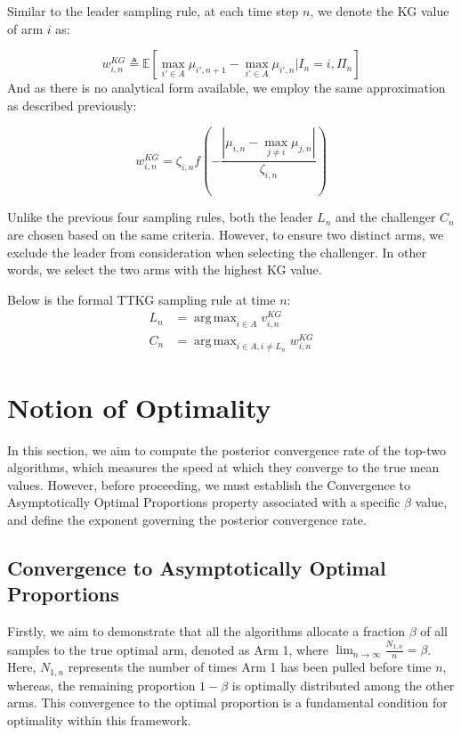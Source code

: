 \documentclass[a4paper, 12pt]{article}
\DeclareMathOperator{\argmax}{arg\,max}
\theoremstyle{definition}
\begin{document}
Similar to the leader sampling rule, at each time step $n$, we denote the KG value of arm $i$ as:

\[
w_{i,n}^{KG} \triangleq \mathbb{E} \left[\max_{i' \in A} \mu_{i',n+1} - \max_{i' \in A} \mu_{i',n} \bigg| I_n = i, \Pi_n \right]
\]
And as there is no analytical form available, we employ the same approximation as described previously:

\[
w_{i,n}^{KG} = \zeta_{i,n} f\left(-\frac{|\mu_{i,n}-\max_{j\neq i} \mu_{j,n}|}{\zeta_{i,n}}\right)
\]

Unlike the previous four sampling rules, both the leader $L_n$ and the challenger $C_n$ are chosen based on the same criteria. However, to ensure two distinct arms, we exclude the leader from consideration when selecting the challenger. In other words, we select the two arms with the highest KG value.

Below is the formal TTKG sampling rule at time $n$:
\begin{align} \label{eq:ttkg}
L_n & = \argmax_{i\in A} v_{i,n}^{KG} \nonumber \\
C_n & = \argmax_{i\in A,i\neq L_n} w_{i,n}^{KG}
\end{align}



\section{Notion of Optimality} \label{sec:optimality}
In this section, we aim to compute the posterior convergence rate of the top-two algorithms, which measures the speed at which they converge to the true mean values. However, before proceeding, we must establish the Convergence to Asymptotically Optimal Proportions property associated with a specific $\beta$ value, and define the exponent governing the posterior convergence rate.


\subsection{Convergence to Asymptotically Optimal Proportions}
Firstly, we aim to demonstrate that all the algorithms allocate a fraction $\beta$ of all samples to the true optimal arm, denoted as Arm 1, where $\lim_{n\to\infty}\frac{N_{1,n}}{n} = \beta$. Here, $N_{1,n}$ represents the number of times Arm 1 has been pulled before time $n$, whereas, the remaining proportion $1-\beta$ is optimally distributed among the other arms. This convergence to the optimal proportion is a fundamental condition for optimality within this framework.
\end{document}
